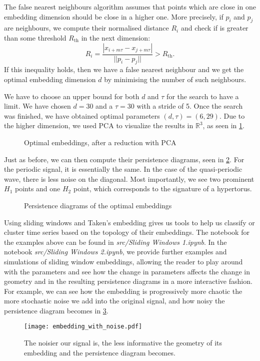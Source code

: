 The false nearest neighbours algorithm assumes that points which are close in one embedding dimension should be close in a higher one. More precisely, if $p_{i}$ and $p_{j}$ are neighbours, we compute their normalised distance $R_{i}$ and check if is greater than some threshold $R_{\text{th}}$ in the next dimension:
\begin{equation*}
  R_{i} = \frac{|x_{i+m\tau}-x_{j+m\tau}|}{||p_{i}-p_{j}||} > R_{\text{th}}.
\end{equation*}
If this inequality holds, then we have a false nearest neighbour and we get the optimal embedding dimension $d$ by minimising the number of such neighbours.

We have to choose an upper bound for both $d$ and $\tau$ for the search to have a limit. We have chosen $d=30$ and a $\tau=30$ with a stride of 5. Once the search was finished, we have obtained optimal parameters $(d, \tau) = (6, 29)$. Due to the higher dimension, we used PCA to visualize the results in $\mathbb{R}^{3}$, as seen in \ref{fig:embedding_automatic}.

\begin{figure}[h!]
    \centering
    \qquad
    \caption{Optimal embeddings, after a reduction with PCA}%
    \label{fig:embedding_automatic}%
\end{figure}

Just as before, we can then compute their persistence diagrams, seen in \ref{fig:embedding_automatic_diagrams}. For the periodic signal, it is essentially the same. In the case of the quasi-periodic wave, there is less noise on the diagonal. Most importantly, we see two prominent $H_{1}$ points and one $H_{2}$ point, which corresponds to the signature of a hypertorus.

\begin{figure}[h!]
    \centering
    \qquad
    \caption{Persistence diagrams of the optimal embeddings}%
    \label{fig:embedding_automatic_diagrams}%
\end{figure}

Using sliding windows and Taken's embedding gives us tools to help us classify or cluster time series based on the topology of their embeddings. The notebook for the examples above can be found in \textit{src/Sliding Windows 1.ipynb}. In the notebook \textit{src/Sliding Windows 2.ipynb}, we provide further examples and simulations of sliding window embeddings, allowing the reader to play around with the parameters and see how the change in parameters affects the change in geometry and in the resulting persistence diagrams in a more interactive fashion. For example, we can see how the embedding is progressively more chaotic the more stochastic noise we add into the original signal, and how noisy the persistence diagram becomes in \ref{fig:embedding_noise}.

\begin{figure}[h!]
  \centering
  \texttt{[image: embedding\_with\_noise.pdf]}
  \caption{The noisier our signal is, the less informative the geometry of its embedding and the persistence diagram becomes.}
  \label{fig:embedding_noise}
\end{figure}
